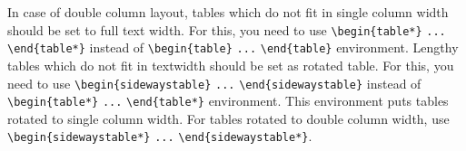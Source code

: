 In case of double column layout, tables which do not fit in single
column width should be set to full text width. For this, you need to
use \verb+\begin{table*}+ \verb+...+ \verb+\end{table*}+ instead of
\verb+\begin{table}+ \verb+...+ \verb+\end{table}+ environment.
Lengthy tables which do not fit in textwidth should be set as rotated
table. For this, you need to use \verb+\begin{sidewaystable}+
\verb+...+ \verb+\end{sidewaystable}+ instead of
\verb+\begin{table*}+ \verb+...+ \verb+\end{table*}+ environment.
This environment puts tables rotated to single column width. For
tables rotated to double column width, use
\verb+\begin{sidewaystable*}+ \verb+...+ \verb+\end{sidewaystable*}+.
